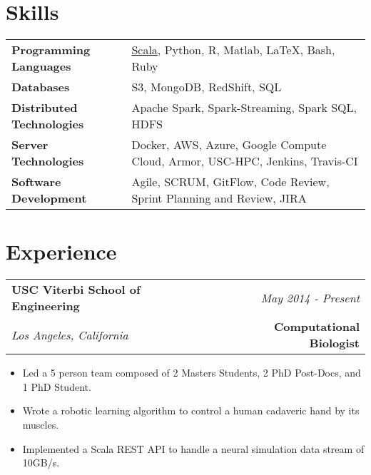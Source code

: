 \documentclass[10pt,a4paper]{article}
\begin{document}
  \newpage

\vspace*{-15mm}\section*{Skills}
  \noindent\begin{tabularx}{17cm}{l X}
    \textbf{Programming Languages} & \href{https://github.com/bcohn12/space/blob/master/src/main/scala/bbdl/space/MyAdder.scala}{Scala}, Python, R, Matlab, \LaTeX, Bash, Ruby \\
    \textbf{Databases} & S3, MongoDB, RedShift, SQL \\
    \textbf{Distributed Technologies} & Apache Spark, Spark-Streaming, Spark SQL, HDFS \\
    \textbf{Server Technologies} & Docker, AWS, Azure, Google Compute Cloud, Armor, USC-HPC, Jenkins, Travis-CI \\
    \textbf{Software Development} & Agile, SCRUM, GitFlow, Code Review, Sprint Planning and Review, JIRA \\
  \end{tabularx}



    \vspace*{3mm}\section*{Experience}
  \noindent\begin{tabularx}{17cm}{X r}
    \textbf{USC Viterbi School of Engineering} & \textit{May 2014 - Present} \\
    \textit{Los Angeles, California} & \textbf{Computational Biologist} \\
  \end{tabularx}

  \vspace*{1mm}\noindent\begin{minipage}{17cm}
    \begin{itemize}[leftmargin=6mm,topsep=0mm,itemsep=-1mm]
      \item Led a 5 person team composed of 2 Masters Students, 2 PhD Post-Docs, and 1 PhD Student.
      \item Wrote a robotic learning algorithm to control a human cadaveric hand by its muscles. 
      \item Implemented a Scala REST API to handle a neural simulation data stream of 10GB/s.
    \end{itemize}
  \end{minipage}
\end{document}
